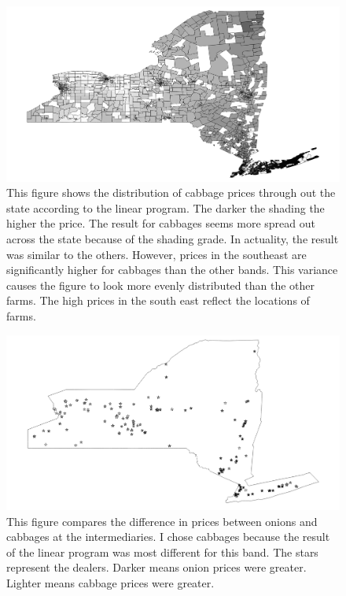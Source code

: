 \documentclass{report}
\begin{document}
\begin{figure}
\centering
\begin{framed}
\includegraphics[scale=.50]{prices_243}
\caption{This figure shows the distribution of cabbage prices through out the state according to the linear program. The darker the shading the higher the price. The result for cabbages seems more spread out across the state because of the shading grade. In actuality, the result was similar to the others. However, prices in the southeast are significantly higher for cabbages than the other bands. This variance causes the figure to look more evenly distributed than the other farms. The high prices in the south east reflect the locations of farms.}
\label{fig:prices_243}
\end{framed}
\end{figure}



\begin{figure}
\centering
\begin{framed}
\includegraphics[scale=.50]{procs_243_49}
\caption{This figure compares the difference in prices between onions and cabbages at the intermediaries. I chose cabbages because the result of the linear program was most different for this band. The stars represent the dealers. Darker means onion prices were greater. Lighter means cabbage prices were greater.}
\label{fig:procs_243_49}
\end{framed}
\end{figure}
\end{document}
